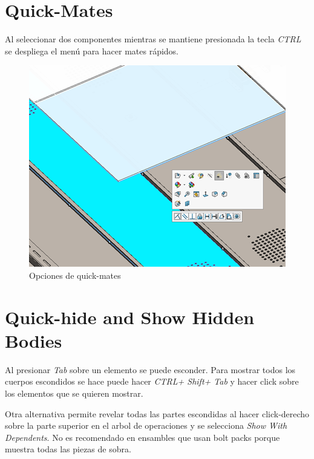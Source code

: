 \documentclass[12pt,letterpaper,final]{report}
\begin{document}
\chapter{Quick-Mates}

Al seleccionar dos componentes mientras se mantiene presionada la tecla \emph{CTRL} se despliega el menú para hacer mates rápidos.

\begin{figure}[H]
	\centering
	\includegraphics[width=0.85\linewidth, height=0.75\textheight,keepaspectratio]{Imagenes/solidworks_quickmates_01}
	\caption{Opciones de quick-mates}
	\label{fig:solidworksquickmates01}
\end{figure}

\chapter{Quick-hide and Show Hidden Bodies}

Al presionar \emph{Tab} sobre un elemento se puede esconder. Para mostrar todos los cuerpos escondidos se hace puede hacer \emph{CTRL+ Shift+ Tab} y hacer click sobre los elementos que se quieren mostrar.

Otra alternativa permite revelar todas las partes escondidas al hacer click-derecho sobre la parte superior en el arbol de operaciones y se selecciona \emph{Show With Dependents}. No es recomendado en ensambles que usan bolt packs porque muestra todas las piezas de sobra.
\end{document}

